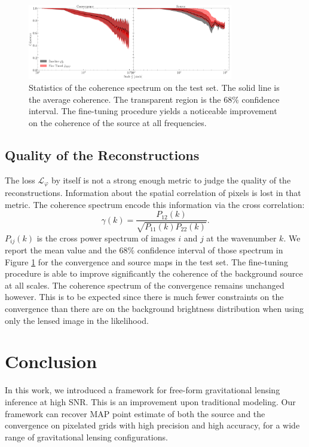 \documentclass[twocolumn]{aastex631}
\begin{document}
\begin{figure}[ht!]
        \centering
        \includegraphics[width=0.8\textwidth]{figures/coherence_spectrum}
        \caption{Statistics of the coherence spectrum on the test set. The solid line is the average 
        coherence. The transparent region is the $68\%$ confidence interval. The fine-tuning 
        procedure yields a noticeable improvement on the coherence of the source at all frequencies.}
        \label{fig:coherence}
\end{figure}

\subsection{Quality of the Reconstructions}\label{sec:quality of reconstructions}

The loss $\mathcal{L}_\varphi$ by itself is not a strong enough metric to judge the quality 
of the reconstructions. Information about the spatial correlation of pixels 
is lost in that metric. The coherence spectrum encode this information via the cross correlation:
\begin{equation}\label{eq:coherence} 
        \gamma(k) = \frac{P_{12}(k)}{\sqrt{P_{11}(k) P_{22}(k)}}.
\end{equation}
$P_{ij}(k)$ is the cross power spectrum of images $i$ and $j$ at 
the wavenumber $k$. We report the mean value and the $68\%$ confidence interval of those
spectrum in Figure \ref{fig:coherence} 
for the convergence and source maps in the test set. The fine-tuning 
procedure is able to improve significantly the coherence of the background 
source at all scales. The coherence spectrum of the convergence remains unchanged however. 
This is to be expected since there is much fewer constraints on the convergence 
than there are on the background brightness distribution when using only the lensed 
image in the likelihood. 



\section{Conclusion}\label{sec:conclusion}
In this work, we introduced a framework for free-form gravitational 
lensing inference at high SNR. This is an improvement upon traditional modeling. 
Our framework can recover MAP point estimate of both the source and the convergence on pixelated grids 
with high precision and high accuracy, for a wide range of gravitational lensing configurations.
\end{document}

